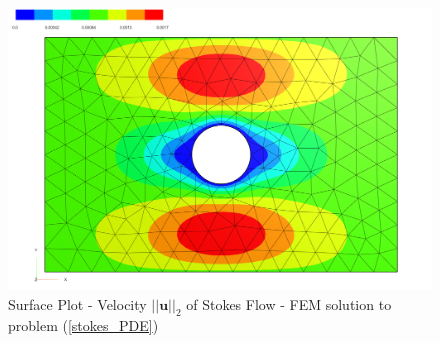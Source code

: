 \null

\begin{figure}[ht]
    \centering
    \includegraphics[width=1\textwidth]{figures/solution_stokes_basic.PNG}
	\caption{Surface Plot - Velocity $||\mathbf{u}||_2$ of Stokes Flow - FEM solution to problem (\ref{stokes_PDE})}
	\label{basic_stokes_flow_plot}
\end{figure}